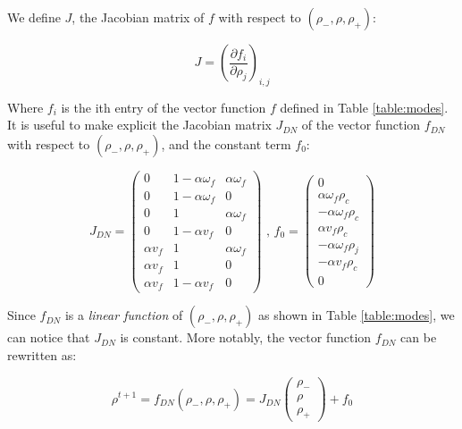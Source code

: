 \documentclass[11pt]{article}
\numberwithin{equation}{section}
\numberwithin{figure}{section}
\numberwithin{table}{section}
\begin{document}
We define $J$, the Jacobian matrix of $f$ with respect to $(\rho_{-},\rho,\rho_{+})$:

\begin{equation}\label{eq:jacobian}
J = \left(\frac{\partial f_{i}}{\partial \rho_{j}}\right)_{i,j}
\end{equation}

\noindent Where $f_{i}$ is the ith entry of the vector function $f$ defined in Table \ref{table:modes}. It is useful to make explicit the Jacobian matrix $J_{DN}$ of the vector function $f_{DN}$ with respect to $(\rho_{-},\rho,\rho_{+})$, and the constant term $f_{0}$:

\begin{equation} \label{eq:jacobianDN}
J_{DN} = \left( \begin{array}{ccc}
0 & 1 - \alpha \omega_{f} & \alpha \omega_{f} \\
0 & 1 - \alpha \omega_{f} & 0 \\
0 & 1 & \alpha \omega_{f} \\
0 &  1 - \alpha v_{f} & 0 \\
\alpha v_{f} & 1 & \alpha \omega_{f} \\
\alpha v_{f} & 1 & 0 \\
\alpha v_{f} & 1 - \alpha v_{f} & 0
\end{array} \right)
\text{ ,   }
f_{0} = \left( \begin{array}{c}
0 \\
\alpha \omega_{f} \rho_{c}\\
-\alpha \omega_{f} \rho_{c}\\
\alpha v_{f} \rho_{c}\\
-\alpha \omega_{f} \rho_{j}\\
-\alpha v_{f} \rho_{c}\\
0
\end{array} \right)
\end{equation}

Since $f_{DN}$ is a \textit{linear function} of $(\rho_{-},\rho,\rho_{+})$ as shown in Table \ref{table:modes}, we can notice that $J_{DN}$ is constant. More notably, the vector function $f_{DN}$ can be rewritten as:

\begin{equation}
\rho^{t+1} = f_{DN}(\rho_{-},\rho,\rho_{+}) = J_{DN}\left( \begin{array}{c}
\rho_{-}\\
\rho\\
\rho_{+}
\end{array} \right)
+ f_{0}
\label{eq:fDN}
\end{equation}
\end{document}
